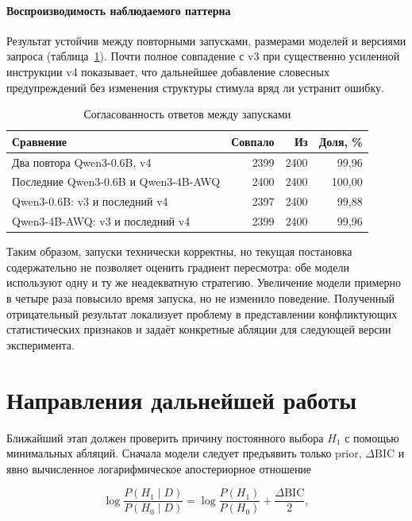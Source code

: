 \documentclass[a4paper,14pt]{extarticle}
\newcommand{\Hone}{\ensuremath{H_1}}
\newcommand{\DeltaBIC}{\ensuremath{\Delta\mathrm{BIC}}}
\begin{document}
\paragraph{Воспроизводимость наблюдаемого паттерна}

Результат устойчив между повторными запусками, размерами моделей и версиями запроса (таблица~\ref{tab:repro-results}). Почти полное совпадение с v3 при существенно усиленной инструкции v4 показывает, что дальнейшее добавление словесных предупреждений без изменения структуры стимула вряд ли устранит ошибку.

\begin{table}[ht]
  \centering
  \small
  \caption{Согласованность ответов между запусками}
  \label{tab:repro-results}
  \begin{tabularx}{\textwidth}{X r r r}
    \toprule
    \textbf{Сравнение} & \textbf{Совпало} & \textbf{Из} & \textbf{Доля, \%} \\
    \midrule
    Два повтора Qwen3-0.6B, v4 & 2399 & 2400 & 99,96 \\
    Последние Qwen3-0.6B и Qwen3-4B-AWQ & 2400 & 2400 & 100,00 \\
    Qwen3-0.6B: v3 и последний v4 & 2397 & 2400 & 99,88 \\
    Qwen3-4B-AWQ: v3 и последний v4 & 2399 & 2400 & 99,96 \\
    \bottomrule
  \end{tabularx}
\end{table}

Таким образом, запуски технически корректны, но текущая постановка содержательно не позволяет оценить градиент пересмотра: обе модели используют одну и ту же неадекватную стратегию. Увеличение модели примерно в четыре раза повысило время запуска, но не изменило поведение. Полученный отрицательный результат локализует проблему в представлении конфликтующих статистических признаков и задаёт конкретные абляции для следующей версии эксперимента.

\section{Направления дальнейшей работы}

Ближайший этап должен проверить причину постоянного выбора \Hone{} с помощью минимальных абляций. Сначала модели следует предъявить только prior, \DeltaBIC{} и явно вычисленное логарифмическое апостериорное отношение

\begin{equation}
  \log\frac{P(H_1\mid D)}{P(H_0\mid D)}
  = \log\frac{P(H_1)}{P(H_0)} + \frac{\Delta\mathrm{BIC}}{2},
\end{equation}
\end{document}
